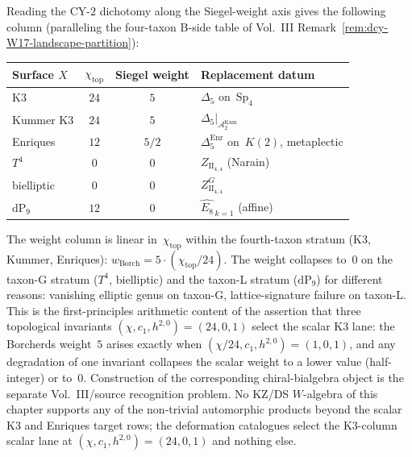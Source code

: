 \begin{remark}
\label{rem:wac-W17-weight-column}
Reading the CY-$2$ dichotomy along the Siegel-weight axis gives
the following column (paralleling the four-taxon B-side table
of Vol.~III Remark~\ref{rem:dcy-W17-landscape-partition}):
\begin{center}
\begin{tabular}{lccl}
\toprule
Surface $X$ & $\chi_{\mathrm{top}}$ & Siegel weight & Replacement datum \\
\midrule
K3 & $24$ & $5$ & $\Delta_5$ on~$\mathrm{Sp}_4$ \\
Kummer K3 & $24$ & $5$ & $\Delta_5\big|_{\mathcal{A}_2^{\mathrm{Kum}}}$ \\
Enriques & $12$ & $5/2$ & $\Delta_5^{\mathrm{Enr}}$ on~$K(2)$, metaplectic \\
$T^4$ & $0$ & $0$ & $Z_{\mathrm{II}_{4,4}}$ (Narain) \\
bielliptic & $0$ & $0$ & $Z_{\mathrm{II}_{4,4}}^G$ \\
$\mathrm{dP}_9$ & $12$ & $0$ & $\widehat{E_8}_{\,k=1}$ (affine) \\
\bottomrule
\end{tabular}
\end{center}
The weight column is linear in~$\chi_{\mathrm{top}}$ within the
fourth-taxon stratum (K3, Kummer, Enriques):
$w_{\mathrm{Borch}} = 5\cdot(\chi_{\mathrm{top}}/24)$. The weight
collapses to~$0$ on the taxon-G stratum ($T^4$, bielliptic) and
the taxon-L stratum ($\mathrm{dP}_9$) for different
reasons: vanishing elliptic genus on taxon-G, lattice-signature
failure on taxon-L. This is the first-principles arithmetic
content of the assertion that three topological invariants
$(\chi, c_1, h^{2,0}) = (24, 0, 1)$ select the scalar K3 lane: the
Borcherds weight~$5$ arises exactly when
$(\chi/24, c_1, h^{2,0}) = (1, 0, 1)$, and any degradation of
one invariant collapses the scalar weight to a lower value
(half-integer) or to~$0$. Construction of the corresponding
chiral-bialgebra object is the separate Vol.~III/source recognition
problem. No KZ/DS $W$-algebra of this
chapter supports any of the non-trivial automorphic products
beyond the scalar K3 and Enriques target rows; the deformation
catalogues select the K3-column scalar lane at
$(\chi, c_1, h^{2,0}) = (24, 0, 1)$ and nothing else.
\end{remark}

